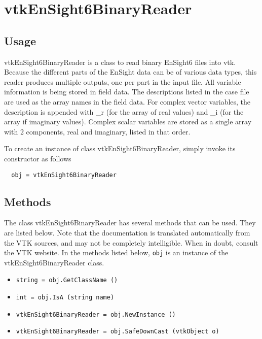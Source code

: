 \section{vtkEnSight6BinaryReader}

\subsection{Usage}

 vtkEnSight6BinaryReader is a class to read binary EnSight6 files into vtk.
 Because the different parts of the EnSight data can be of various data
 types, this reader produces multiple outputs, one per part in the input
 file.
 All variable information is being stored in field data.  The descriptions
 listed in the case file are used as the array names in the field data.
 For complex vector variables, the description is appended with \_r (for the
 array of real values) and \_i (for the array if imaginary values).  Complex
 scalar variables are stored as a single array with 2 components, real and
 imaginary, listed in that order.

To create an instance of class vtkEnSight6BinaryReader, simply
invoke its constructor as follows
\begin{verbatim}
  obj = vtkEnSight6BinaryReader
\end{verbatim}
\subsection{Methods}

The class vtkEnSight6BinaryReader has several methods that can be used.
  They are listed below.
Note that the documentation is translated automatically from the VTK sources,
and may not be completely intelligible.  When in doubt, consult the VTK website.
In the methods listed below, \verb|obj| is an instance of the vtkEnSight6BinaryReader class.
\begin{itemize}
\item  \verb|string = obj.GetClassName ()|

\item  \verb|int = obj.IsA (string name)|

\item  \verb|vtkEnSight6BinaryReader = obj.NewInstance ()|

\item  \verb|vtkEnSight6BinaryReader = obj.SafeDownCast (vtkObject o)|

\end{itemize}
